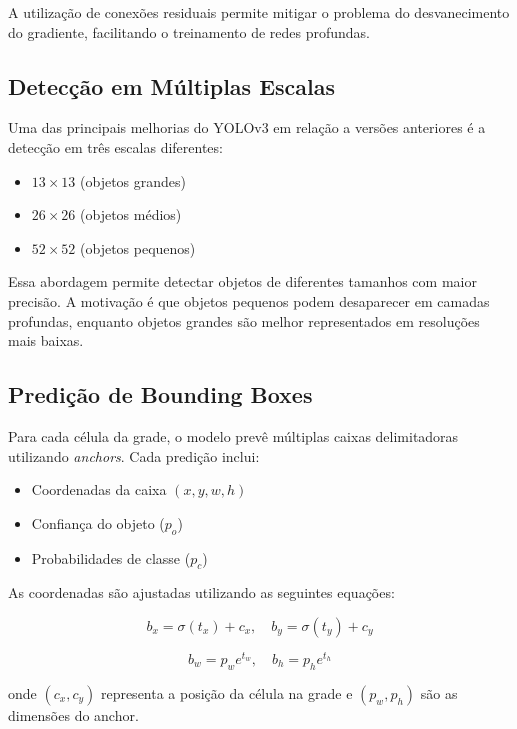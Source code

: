 \documentclass[conference]{IEEEtran}
\begin{document}
A utilização de conexões residuais permite mitigar o problema do desvanecimento do gradiente, facilitando o treinamento de redes profundas.

\subsection{Detecção em Múltiplas Escalas}

Uma das principais melhorias do YOLOv3 em relação a versões anteriores é a detecção em três escalas diferentes:

\begin{itemize}
    \item $13 \times 13$ (objetos grandes)
    \item $26 \times 26$ (objetos médios)
    \item $52 \times 52$ (objetos pequenos)
\end{itemize}

Essa abordagem permite detectar objetos de diferentes tamanhos com maior precisão. A motivação é que objetos pequenos podem desaparecer em camadas profundas, enquanto objetos grandes são melhor representados em resoluções mais baixas.

\subsection{Predição de Bounding Boxes}

Para cada célula da grade, o modelo prevê múltiplas caixas delimitadoras utilizando \textit{anchors}. Cada predição inclui:

\begin{itemize}
    \item Coordenadas da caixa $(x, y, w, h)$
    \item Confiança do objeto ($p_o$)
    \item Probabilidades de classe ($p_c$)
\end{itemize}

As coordenadas são ajustadas utilizando as seguintes equações:

\begin{equation}
b_x = \sigma(t_x) + c_x, \quad b_y = \sigma(t_y) + c_y
\end{equation}

\begin{equation}
b_w = p_w e^{t_w}, \quad b_h = p_h e^{t_h}
\end{equation}

onde $(c_x, c_y)$ representa a posição da célula na grade e $(p_w, p_h)$ são as dimensões do anchor.
\end{document}
